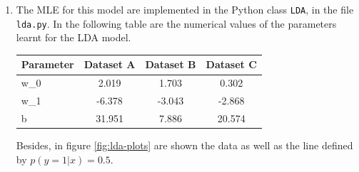 \documentclass[a4paper, 11pt]{report}
\begin{document}
\begin{enumerate}[label=\alph*]
    \item The MLE for this model are implemented in the Python class \texttt{LDA}, in the file \texttt{lda.py}. In the following table are the numerical values of the parameters learnt for the LDA model. \\

        \begin{tabular}{ | l || *{3}{c| } }
             \hline
                Parameter & Dataset A & Dataset B & Dataset C \\
             \hline			
               w_0 & 2.019 & 1.703 & 0.302 \\
               w_1 & -6.378 & -3.043 & -2.868 \\
               b & 31.951 & 7.886 & 20.574 \\
             \hline  
         \end{tabular}
         \vspace*{.6em}

    Besides, in figure \ref{fig:lda-plots} are shown the data as well as the line defined by $p \left( y = 1 | x \right) = 0.5$.


\end{enumerate}
\end{document}
